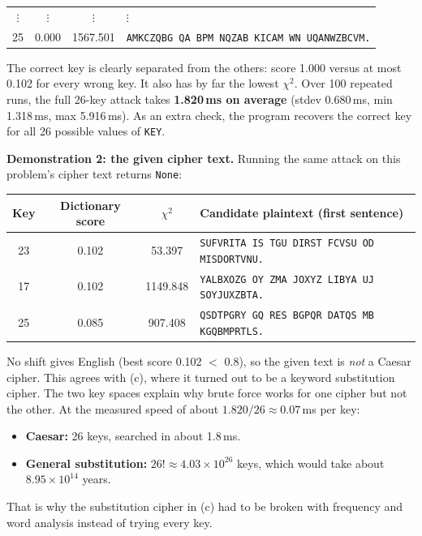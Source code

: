 \documentclass[a4paper, 10pt]{article}
\begin{document}
\begin{problem}
\begin{subproblems_alpha}
\begin{solution}
\begin{center}
\begin{tabular}{cccl}
				      $\vdots$   & $\vdots$         & $\vdots$        & $\vdots$                                                     \\
				      25         & 0.000            & 1567.501        & \texttt{AMKCZQBG QA BPM NQZAB KICAM WN UQANWZBCVM.}          \\
				      \bottomrule
			      \end{tabular}
		      \end{center}
		      The correct key is clearly separated from the others: score 1.000 versus at most 0.102 for every wrong key.
		      It also has by far the lowest $\chi^2$.
		      Over 100 repeated runs, the full 26-key attack takes
		      \textbf{1.820\,ms on average} (stdev 0.680\,ms, min 1.318\,ms, max 5.916\,ms).
		      As an extra check, the program recovers the correct key for all 26 possible values of \texttt{KEY}.

		      \textbf{Demonstration 2: the given cipher text.}
		      Running the same attack on this problem's cipher text returns \texttt{None}:
		      \begin{center}
			      \footnotesize
			      \begin{tabular}{cccl}
				      \toprule
				      Key & Dictionary score & $\chi^2$ & Candidate plaintext (first sentence)                \\
				      \midrule
				      23  & 0.102            & 53.397   & \texttt{SUFVRITA IS TGU DIRST FCVSU OD MISDORTVNU.} \\
				      17  & 0.102            & 1149.848 & \texttt{YALBXOZG OY ZMA JOXYZ LIBYA UJ SOYJUXZBTA.} \\
				      25  & 0.085            & 907.408  & \texttt{QSDTPGRY GQ RES BGPQR DATQS MB KGQBMPRTLS.} \\
				      \bottomrule
			      \end{tabular}
		      \end{center}
		      No shift gives English (best score 0.102 $<$ 0.8), so the given text is \emph{not} a Caesar cipher.
		      This agrees with (c), where it turned out to be a keyword substitution cipher.
		      The two key spaces explain why brute force works for one cipher but not the other.
		      At the measured speed of about $1.820 / 26 \approx 0.07$\,ms per key:
		      \begin{itemize}
			      \item \textbf{Caesar:} 26 keys, searched in about 1.8\,ms.
			      \item \textbf{General substitution:} $26! \approx 4.03 \times 10^{26}$ keys, which would take about $8.95 \times 10^{14}$ years.
		      \end{itemize}
		      That is why the substitution cipher in (c) had to be broken with frequency and word analysis instead of trying every key.
	      \end{solution}

\end{subproblems_alpha}
\end{problem}
\end{document}
